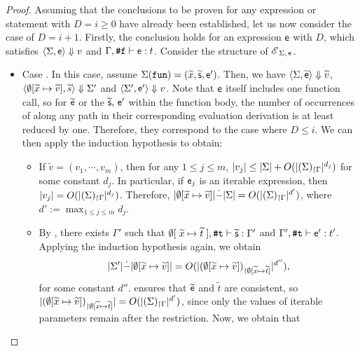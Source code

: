 \documentclass[runningheads]{llncs}
\begin{document}
\begin{proof}
Assuming that the conclusions to be proven for any expression or statement with $D=i\geq 0$ have already been established, let us now consider the case of $D=i+1$.
Firstly, the conclusion holds for an expression $\mathsf{e}$ with $D$, which satisfies $\langle\Sigma,\mathsf{e}\rangle\Downarrow{v}$ and $\Gamma,\texttt{\#}\mathtt{f}\vdash\mathsf{e}:t$.
Consider the structure of $\mathscr{E}_{\;\Sigma,\,\mathsf{e}}$.
\begin{itemize}
    \item Case . In this case, assume $\Sigma(\texttt{fun})=(\widetilde{x},\widetilde{\mathsf{s}},\mathsf{e}')$. Then, we have $\langle\Sigma,\widetilde{\mathsf{e}}\rangle\Downarrow{\widetilde{v}}$, $\langle\emptyset[\widetilde{x}\mapsto\widetilde{v}],\widetilde{s}\rangle\Downarrow{\Sigma'}$ and $\langle\Sigma',\mathsf{e}'\rangle\Downarrow{v}$.
    Note that $\mathsf{e}$ itself includes one function call, so for $\widetilde{\mathsf{e}}$ or the $\widetilde{\mathsf{s}},\,\mathsf{e}'$ within the function body, the number of occurrences of  along any path in their corresponding evaluation derivation is at least reduced by one.
    Therefore, they correspond to the case where $D\le i$. We can then apply the induction hypothesis to obtain:
    \begin{itemize}
        \item  If $\widetilde{v}=(v_1,\cdots,v_m)$, then for any $1\leq j\leq m$, $\vert v_j\vert\le\vert\Sigma\vert+O(\vert{(\Sigma)_{\restriction \Gamma}}\vert^{d_j})$ for some constant $d_j$. In particular, if $\mathsf{e}_j$ is an iterable expression, then $\vert v_j\vert=O(\vert{(\Sigma)_{\restriction \Gamma}}\vert^{d_j})$.
        Therefore, $\vert\emptyset[\widetilde{x}\mapsto\widetilde{v}]\vert\dot{-}\vert\Sigma\vert=O(\vert{(\Sigma)_{\restriction \Gamma}}\vert^{d'})$, where $d':=\max_{1\le j\le m} d_j$.
        \item By , there exists $\Gamma'$ such that $\emptyset[\;\widetilde{x}\mapsto\widetilde{t}\;],\texttt{\#}\mathtt{t}\vdash\widetilde{\mathsf{s}}:\Gamma'$ and $\Gamma',\texttt{\#}\mathtt{t}\vdash\mathsf{e}':t'$.
        Applying the induction hypothesis again, we obtain
        \begin{equation}
        \vert\Sigma'\vert\dot{-}\vert\emptyset[\widetilde{x}\mapsto\widetilde{v}]\vert=O(\vert{(\emptyset[\widetilde{x}\mapsto\widetilde{v}])_{\restriction \emptyset[\widetilde{x}\mapsto\widetilde{t}]}}\vert^{d''}),
        \end{equation}
        for some constant $d''$.
         ensures that $\widetilde{\mathsf{e}}$ and $\widetilde{t}$ are consistent, so $\vert{(\emptyset[\widetilde{x}\mapsto\widetilde{v}])_{\restriction \emptyset[\widetilde{x}\mapsto\widetilde{t}]}}\vert=O(\vert{(\Sigma)_{\restriction \Gamma}}\vert^{d'})$, since only the values of iterable parameters remain after the restriction. Now, we obtain that

\end{itemize}
\end{itemize}
\end{proof}
\end{document}
